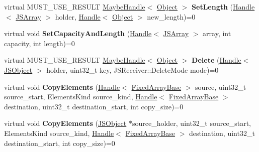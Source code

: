 \begin{DoxyCompactItemize}
\item 
\hypertarget{classv8_1_1internal_1_1_elements_accessor_afa60fd372dee6f0bc7cfd81db267abf0}{}virtual M\+U\+S\+T\+\_\+\+U\+S\+E\+\_\+\+R\+E\+S\+U\+L\+T \hyperlink{classv8_1_1internal_1_1_maybe_handle}{Maybe\+Handle}$<$ \hyperlink{classv8_1_1internal_1_1_object}{Object} $>$ {\bfseries Set\+Length} (\hyperlink{classv8_1_1internal_1_1_handle}{Handle}$<$ \hyperlink{classv8_1_1internal_1_1_j_s_array}{J\+S\+Array} $>$ holder, \hyperlink{classv8_1_1internal_1_1_handle}{Handle}$<$ \hyperlink{classv8_1_1internal_1_1_object}{Object} $>$ new\+\_\+length)=0\label{classv8_1_1internal_1_1_elements_accessor_afa60fd372dee6f0bc7cfd81db267abf0}

\item 
\hypertarget{classv8_1_1internal_1_1_elements_accessor_a346352866dbb18d50e0b4747b66eccde}{}virtual void {\bfseries Set\+Capacity\+And\+Length} (\hyperlink{classv8_1_1internal_1_1_handle}{Handle}$<$ \hyperlink{classv8_1_1internal_1_1_j_s_array}{J\+S\+Array} $>$ array, int capacity, int length)=0\label{classv8_1_1internal_1_1_elements_accessor_a346352866dbb18d50e0b4747b66eccde}

\item 
\hypertarget{classv8_1_1internal_1_1_elements_accessor_a9f3e3c20a5b56e844fd6adb13d3a919c}{}virtual M\+U\+S\+T\+\_\+\+U\+S\+E\+\_\+\+R\+E\+S\+U\+L\+T \hyperlink{classv8_1_1internal_1_1_maybe_handle}{Maybe\+Handle}$<$ \hyperlink{classv8_1_1internal_1_1_object}{Object} $>$ {\bfseries Delete} (\hyperlink{classv8_1_1internal_1_1_handle}{Handle}$<$ \hyperlink{classv8_1_1internal_1_1_j_s_object}{J\+S\+Object} $>$ holder, uint32\+\_\+t key, J\+S\+Receiver\+::\+Delete\+Mode mode)=0\label{classv8_1_1internal_1_1_elements_accessor_a9f3e3c20a5b56e844fd6adb13d3a919c}

\item 
\hypertarget{classv8_1_1internal_1_1_elements_accessor_a011ca92e34b6b032e69142c4f3fc186f}{}virtual void {\bfseries Copy\+Elements} (\hyperlink{classv8_1_1internal_1_1_handle}{Handle}$<$ \hyperlink{classv8_1_1internal_1_1_fixed_array_base}{Fixed\+Array\+Base} $>$ source, uint32\+\_\+t source\+\_\+start, Elements\+Kind source\+\_\+kind, \hyperlink{classv8_1_1internal_1_1_handle}{Handle}$<$ \hyperlink{classv8_1_1internal_1_1_fixed_array_base}{Fixed\+Array\+Base} $>$ destination, uint32\+\_\+t destination\+\_\+start, int copy\+\_\+size)=0\label{classv8_1_1internal_1_1_elements_accessor_a011ca92e34b6b032e69142c4f3fc186f}

\item 
\hypertarget{classv8_1_1internal_1_1_elements_accessor_abb137b592fd9ed5338425d843b41188f}{}virtual void {\bfseries Copy\+Elements} (\hyperlink{classv8_1_1internal_1_1_j_s_object}{J\+S\+Object} $\ast$source\+\_\+holder, uint32\+\_\+t source\+\_\+start, Elements\+Kind source\+\_\+kind, \hyperlink{classv8_1_1internal_1_1_handle}{Handle}$<$ \hyperlink{classv8_1_1internal_1_1_fixed_array_base}{Fixed\+Array\+Base} $>$ destination, uint32\+\_\+t destination\+\_\+start, int copy\+\_\+size)=0\label{classv8_1_1internal_1_1_elements_accessor_abb137b592fd9ed5338425d843b41188f}


\end{DoxyCompactItemize}
